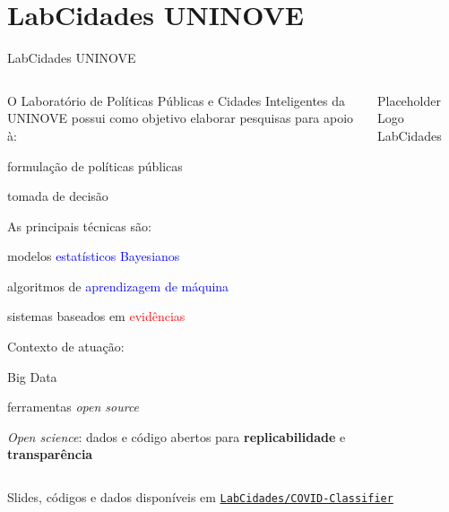 \documentclass[aspectratio=169]{beamer}                    %
\begin{document}
\section{LabCidades UNINOVE}
\begin{frame}{LabCidades UNINOVE}
    \begin{columns}
        \begin{column}{0.8\textwidth}
            \begin{vfilleditems}
                \item O Laboratório de Políticas Públicas e Cidades Inteligentes da UNINOVE possui como objetivo elaborar pesquisas para apoio à:
                \begin{vfilleditems}
                    \small
                    \item formulação de políticas públicas
                    \item tomada de decisão
                \end{vfilleditems}
                \item As principais técnicas são:
                \begin{vfilleditems}
                    \small
                    \item modelos \textcolor{blue}{estatísticos Bayesianos}
                    \item algoritmos de \textcolor{blue}{aprendizagem de máquina}
                    \item sistemas baseados em \textcolor{red}{evidências}
                \end{vfilleditems}
                \item Contexto de atuação:
                \begin{vfilleditems}
                    \small
                    \item Big Data
                    \item ferramentas \textit{open source}
                    \item \textit{Open science}: \footnotesize dados e código abertos para \textbf{replicabilidade} e \textbf{transparência}
                \end{vfilleditems}
            \end{vfilleditems}
        \end{column}
        \begin{column}{0.2\textwidth}
            \centering
            Placeholder Logo LabCidades
        \end{column}
    \end{columns}
    \centering
    Slides, códigos e dados disponíveis em \href{https://github.com/LabCidades/COVID-Classifier}{\texttt{LabCidades/COVID-Classifier}}
\end{frame}
\end{document}
